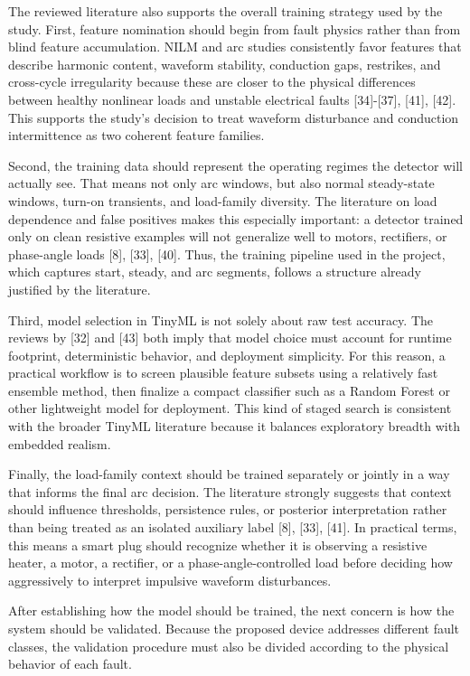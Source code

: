 The reviewed literature also supports the overall training strategy used
by the study. First, feature nomination should begin from fault physics
rather than from blind feature accumulation. NILM and arc studies
consistently favor features that describe harmonic content, waveform
stability, conduction gaps, restrikes, and cross-cycle irregularity
because these are closer to the physical differences between healthy
nonlinear loads and unstable electrical faults {[}34{]}-{[}37{]},
{[}41{]}, {[}42{]}. This supports the study's decision to treat waveform
disturbance and conduction intermittence as two coherent feature
families.

Second, the training data should represent the operating regimes the
detector will actually see. That means not only arc windows, but also
normal steady-state windows, turn-on transients, and load-family
diversity. The literature on load dependence and false positives makes
this especially important: a detector trained only on clean resistive
examples will not generalize well to motors, rectifiers, or phase-angle
loads {[}8{]}, {[}33{]}, {[}40{]}. Thus, the training pipeline used in
the project, which captures start, steady, and arc segments, follows a
structure already justified by the literature.

Third, model selection in TinyML is not solely about raw test accuracy.
The reviews by {[}32{]} and {[}43{]} both imply that model choice must
account for runtime footprint, deterministic behavior, and deployment
simplicity. For this reason, a practical workflow is to screen plausible
feature subsets using a relatively fast ensemble method, then finalize a
compact classifier such as a Random Forest or other lightweight model
for deployment. This kind of staged search is consistent with the
broader TinyML literature because it balances exploratory breadth with
embedded realism.

Finally, the load-family context should be trained separately or jointly
in a way that informs the final arc decision. The literature strongly
suggests that context should influence thresholds, persistence rules, or
posterior interpretation rather than being treated as an isolated
auxiliary label {[}8{]}, {[}33{]}, {[}41{]}. In practical terms, this
means a smart plug should recognize whether it is observing a resistive
heater, a motor, a rectifier, or a phase-angle-controlled load before
deciding how aggressively to interpret impulsive waveform disturbances.

After establishing how the model should be trained, the next concern is
how the system should be validated. Because the proposed device
addresses different fault classes, the validation procedure must also be
divided according to the physical behavior of each fault.

